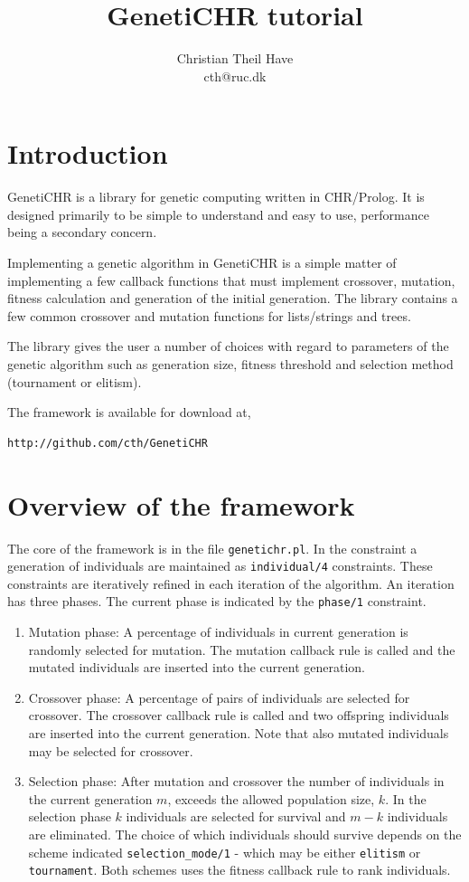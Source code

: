 \documentclass{article}
\title{GenetiCHR tutorial}
\author{Christian Theil Have\\ cth@ruc.dk}
\begin{document}
\maketitle

\section{Introduction}

GenetiCHR is a library for genetic computing written in CHR/Prolog. It is designed primarily to be simple to understand and easy to use, performance being a secondary concern. 

Implementing a genetic algorithm in GenetiCHR is a simple matter of implementing a few callback functions that must implement crossover, mutation, fitness calculation
and generation of the initial generation. The library contains a few common crossover and mutation functions for lists/strings and trees.

The library gives the user a number of choices with regard to parameters of the genetic algorithm such as generation size, fitness threshold and selection method (tournament or elitism).


The framework is available for download at,
\begin{verbatim}
http://github.com/cth/GenetiCHR
\end{verbatim}

\section{Overview of the framework}

The core of the framework is in the file \verb|genetichr.pl|. In the constraint a generation of individuals are maintained as \verb|individual/4| constraints. These constraints are iteratively refined
in each iteration of the algorithm. An iteration has three phases. The current phase is indicated by the \verb|phase/1| constraint.

\begin{enumerate}
\item Mutation phase: A percentage of individuals in current generation is randomly selected for mutation. The mutation callback rule is called and the mutated individuals are inserted into the current generation.
\item Crossover phase:  A percentage of pairs of individuals are selected for crossover. The crossover callback rule is called and two offspring individuals are inserted into the current generation. Note that also mutated individuals may be selected for crossover.
\item Selection phase: After mutation and crossover the number of individuals in the current generation $m$, exceeds the allowed population size, $k$. In the selection phase $k$ individuals are selected for survival and $m-k$ individuals are eliminated. The choice of which individuals should survive depends on the scheme indicated \verb|selection_mode/1| - which may be either \verb|elitism| or \verb|tournament|. Both schemes uses the fitness callback rule to rank individuals.
\end{enumerate}
\end{document}
